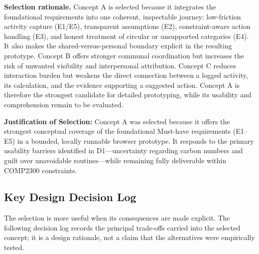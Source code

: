 \documentclass[12pt,a4paper]{article}
\begin{document}
\textbf{Selection rationale.} Concept A is selected because it integrates the foundational requirements into one coherent, inspectable journey: low-friction activity capture (E1/E5), transparent assumptions (E2), constraint-aware action handling (E3), and honest treatment of circular or unsupported categories (E4). It also makes the shared-versus-personal boundary explicit in the resulting prototype. Concept B offers stronger communal coordination but increases the risk of unwanted visibility and interpersonal attribution. Concept C reduces interaction burden but weakens the direct connection between a logged activity, its calculation, and the evidence supporting a suggested action. Concept A is therefore the strongest candidate for detailed prototyping, while its usability and comprehension remain to be evaluated.

\textbf{Justification of Selection:} Concept A was selected because it offers the strongest conceptual coverage of the foundational Must-have requirements (E1--E5) in a bounded, locally runnable browser prototype. It responds to the primary usability barriers identified in D1—uncertainty regarding carbon numbers and guilt over unavoidable routines—while remaining fully deliverable within COMP2300 constraints.

\subsection{Key Design Decision Log}
The selection is more useful when its consequences are made explicit. The following decision log records the principal trade-offs carried into the selected concept; it is a design rationale, not a claim that the alternatives were empirically tested.
\end{document}
